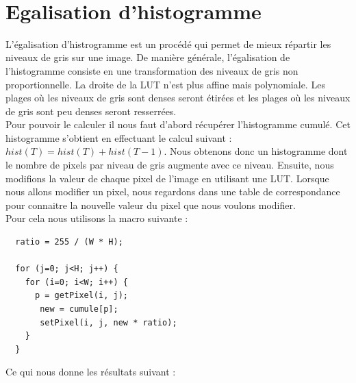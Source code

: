 \documentclass[a4paper,11pt]{article}
\begin{document}
  \ \\
  

  
  
  \section{Egalisation d'histogramme}
  L'égalisation d'histrogramme est un procédé qui permet de mieux répartir les niveaux de gris sur une image.
  De manière générale, l'égalisation de l'histogramme consiste en une transformation des niveaux de gris non 
  proportionnelle. La droite de la LUT n'est plus affine mais polynomiale. Les plages où les niveaux de gris 
  sont denses seront étirées et les plages où les niveaux de gris sont peu denses seront resserrées.\\
  
  Pour pouvoir le calculer il nous faut d'abord récupérer l'histogramme cumulé. 
  Cet histogramme s'obtient en effectuant le calcul suivant : $hist(T)=hist(T)+hist(T-1)$. Nous obtenons donc
  un histogramme dont le nombre de pixels par niveau de gris augmente avec ce niveau. Ensuite, nous modifions la valeur de chaque pixel
  de l'image en utilisant une LUT. Lorsque nous allons modifier un pixel, nous regardons dans une table de correspondance pour 
  connaitre la nouvelle valeur du pixel que nous voulons modifier.\\
  
  Pour cela nous utilisons la macro suivante :\\
  
  \begin{lstlisting}
  ratio = 255 / (W * H);

  for (j=0; j<H; j++) {
    for (i=0; i<W; i++) {
      p = getPixel(i, j);
       new = cumule[p];
       setPixel(i, j, new * ratio);
    }
  }
  \end{lstlisting}

  \newpage

  Ce qui nous donne les résultats suivant :\\
  
\end{document}
